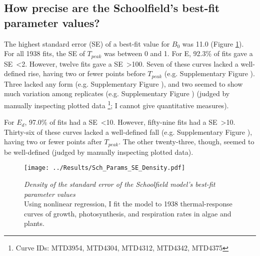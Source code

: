 \documentclass[11pt]{article}
\begin{document}
\subsection*{How precise are the Schoolfield's best-fit parameter values?}

The highest standard error (SE) of a best-fit value for $B_{0}$ was 11.0 (Figure \ref{Sch_SE_density}).
For all 1938 fits, the SE of $T_{peak}$ was between 0 and 1.
For E, 92.3\% of fits gave a SE\ \textless 2. However, twelve fits gave a SE\ \textgreater 100. Seven of these curves lacked a well-defined rise, having two or fewer points before $T_{peak}$ (e.g. Supplementary Figure ). Three lacked any form (e.g. Supplementary Figure ), and two seemed to show much variation among replicates (e.g. Supplementary Figure ) (judged by manually inspecting plotted data \footnote{Curve IDs: MTD3954, MTD4304, MTD4312, MTD4342, MTD4375}; I cannot give quantitative measures).

For $E_{d}$, 97.0\% of fits had a SE\ \textless 10. However, fifty-nine fits had a SE\ \textgreater 10. Thirty-six of these curves lacked a well-defined fall (e.g. Supplementary Figure ), having two or fewer points after $T_{peak}$. The other twenty-three, though, seemed to be well-defined (judged by manually inspecting plotted data).



\begin{figure}[h]
	\centering
	\texttt{[image: ../Results/Sch\_Params\_SE\_Density.pdf]}
	\caption{\textit{Density of the standard error of the Schoolfield model's best-fit parameter values}\\
		Using nonlinear regression, I fit the model to 1938 thermal-response curves of growth, photosynthesis, and respiration rates in algae and plants. %
	}
	\label{Sch_SE_density}
\end{figure}
\end{document}
